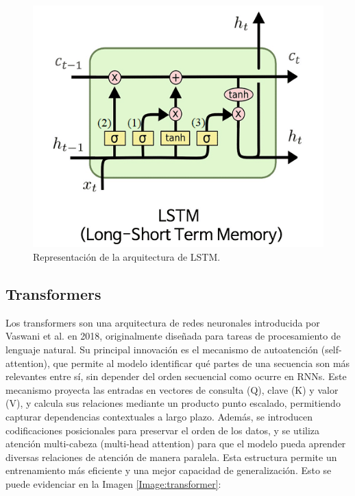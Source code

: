\begin{figure}[h!] 
    \includegraphics[width=1\textwidth]{images/lstm.png} 
    \centering 
    \caption{Representación de la arquitectura de LSTM\protect\cite{datascientest2024lstm}.} 
    \label{lstm} 
\end{figure}

\subsection{Transformers}

Los transformers son una arquitectura de redes neuronales 
introducida por Vaswani et al. en 2018\cite{ShervineAmidi2018}, originalmente diseñada 
para tareas de procesamiento de lenguaje natural. Su principal 
innovación es el mecanismo de autoatención (self-attention), 
que permite al modelo identificar qué partes de una secuencia 
son más relevantes entre sí, sin depender del orden 
secuencial como ocurre en RNNs. Este mecanismo proyecta las 
entradas en vectores de consulta (Q), clave (K) y valor (V), 
y calcula sus relaciones mediante un producto punto escalado, 
permitiendo capturar dependencias contextuales a largo plazo. 
Además, se introducen codificaciones posicionales para 
preservar el orden de los datos, y se utiliza atención 
multi-cabeza (multi-head attention) para que el modelo pueda 
aprender diversas relaciones de atención de manera paralela. 
Esta estructura permite un entrenamiento más eficiente y una 
mejor capacidad de generalización. Esto se puede evidenciar en 
la Imagen \ref{Image:transformer}:

